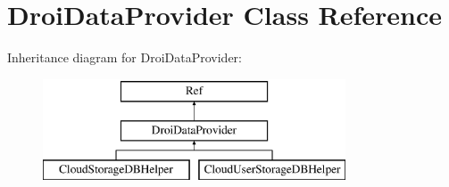 \hypertarget{class_droi_data_provider}{}\section{Droi\+Data\+Provider Class Reference}
\label{class_droi_data_provider}
Inheritance diagram for Droi\+Data\+Provider\+:\begin{figure}[H]
\begin{center}
\leavevmode
\includegraphics[height=3.000000cm]{de/de3/class_droi_data_provider}
\end{center}
\end{figure}
